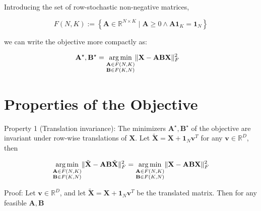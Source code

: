 \documentclass[oneside]{article}
\begin{document}
Introducing the set of row-stochastic non-negative matrices,

\begin{equation}
    F(N, K) := \left\{ \mathbf{A} \in \mathbb{R}^{N \times K} \mid  \mathbf{A} \geq 0 \land \mathbf{A} \mathbf{1}_K = \mathbf{1}_N \right\}
\end{equation}

we can write the objective more compactly as:

\begin{equation}
    \begin{aligned}
    \mathbf{A}^\star, \mathbf{B}^\star =& \; \underset{\begin{subarray}{c} \mathbf{A} \in F(N, K) \\ 
        \mathbf{B} \in F(K, N) \end{subarray}}{\arg \min} \| \mathbf{X} - \mathbf{A} \mathbf{B} \mathbf{X}\|_F^2
    \end{aligned}
\end{equation}


\section{Properties of the Objective}

Property 1 (Translation invariance): The minimizers $\mathbf{A}^\star, \mathbf{B}^\star$ of the objective are invariant under row-wise translations of $\mathbf{X}$. Let $\tilde{\mathbf{X}} = \mathbf{X} + \mathbf{1}_N \mathbf{v}^T$ for any $\mathbf{v} \in \mathbb{R}^D$, then

\begin{equation}
    \underset{\begin{subarray}{c} \mathbf{A} \in F(N, K) \\ \mathbf{B} \in F(K, N) \end{subarray}}{\arg \min} \| \tilde{\mathbf{X}} - \mathbf{A} \mathbf{B} \tilde{\mathbf{X}} \|_F^2 
    = 
    \underset{\begin{subarray}{c} \mathbf{A} \in F(N, K) \\ \mathbf{B} \in F(K, N) \end{subarray}}{\arg \min} \| \mathbf{X} - \mathbf{A} \mathbf{B} \mathbf{X}\|_F^2 
\end{equation}

Proof: Let $\mathbf{v} \in \mathbb{R}^{D}$, and let $\tilde{\mathbf{X}} = \mathbf{X} + \mathbf{1}_N \mathbf{v}^T$ be the translated matrix. Then for any feasible $\mathbf{A}, \mathbf{B}$
\end{document}
